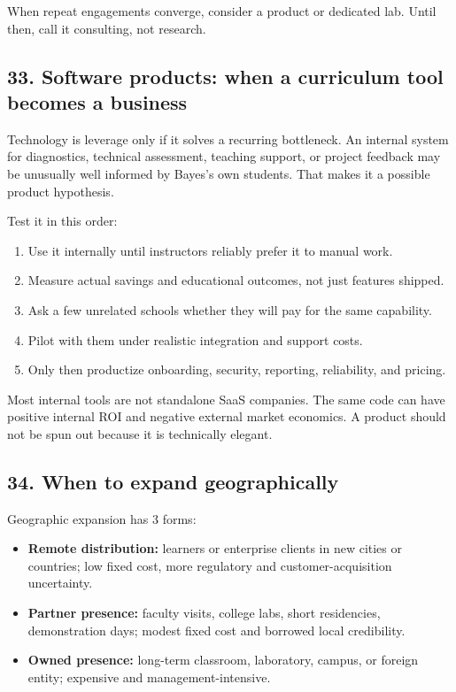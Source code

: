 When repeat engagements converge, consider a product or dedicated lab. Until then, call it consulting, not research.

\subsection{33. Software products: when a curriculum tool becomes a business}

Technology is leverage only if it solves a recurring bottleneck. An internal system for diagnostics, technical assessment, teaching support, or project feedback may be unusually well informed by Bayes's own students. That makes it a possible product hypothesis.

Test it in this order:

\begin{enumerate}[leftmargin=*,itemsep=1.5pt]
  \item Use it internally until instructors reliably prefer it to manual work.
  \item Measure actual savings and educational outcomes, not just features shipped.
  \item Ask a few unrelated schools whether they will pay for the same capability.
  \item Pilot with them under realistic integration and support costs.
  \item Only then productize onboarding, security, reporting, reliability, and pricing.
\end{enumerate}

Most internal tools are not standalone SaaS companies. The same code can have positive internal ROI and negative external market economics. A product should not be spun out because it is technically elegant.

\subsection{34. When to expand geographically}

Geographic expansion has 3 forms:

\begin{itemize}[leftmargin=*,itemsep=1.5pt]
  \item \textbf{Remote distribution:} learners or enterprise clients in new cities or countries; low fixed cost, more regulatory and customer-acquisition uncertainty.
  \item \textbf{Partner presence:} faculty visits, college labs, short residencies, demonstration days; modest fixed cost and borrowed local credibility.
  \item \textbf{Owned presence:} long-term classroom, laboratory, campus, or foreign entity; expensive and management-intensive.
\end{itemize}

